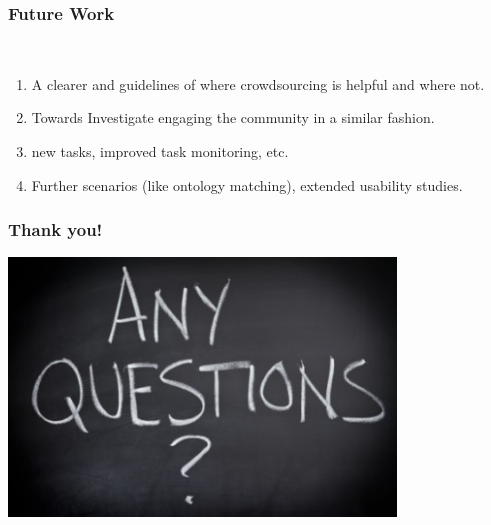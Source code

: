 \documentclass{beamer}
\begin{document}
\begin{frame}
  \frametitle{Future Work}

 \\
    \begin{enumerate}
       \item A clearer  and guidelines of where crowdsourcing is helpful and where not.
       \item Towards  Investigate engaging the community in a similar fashion. 
       \item {} new tasks, improved task monitoring, etc. 
       \item Further scenarios (like ontology matching), extended usability studies.
    \end{enumerate}
\end{frame}



\begin{frame}
  \frametitle{Thank you!}
   \center
  \includegraphics[height=2.7in]{images/questions}
\end{frame}


\end{document}
